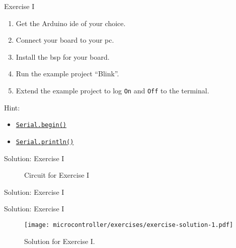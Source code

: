 \begin{frame}
    \begin{exampleblock}{Exercise I}
        \begin{enumerate}
            \item Get the Arduino\textregistered{} \acs{ide} of your choice.
            \item Connect your board to your \acs{pc}.
            \item Install the \ac{bsp} for your board.
            \item Run the example project ``Blink''.
            \item Extend the example project to log \texttt{On} and \texttt{Off} to the terminal.%
        \end{enumerate}
        \par Hint:
        \begin{itemize}
            \item \href{https://www.arduino.cc/reference/en/language/functions/communication/serial/begin/}{\texttt{Serial.begin()}}
            \item \href{https://www.arduino.cc/reference/en/language/functions/communication/serial/println/}{\texttt{Serial.println()}}
        \end{itemize}
    \end{exampleblock}
\end{frame}

\begin{frame}{Solution: Exercise I}
    \begin{figure}
        \caption{Circuit for Exercise I}
    \end{figure}
\end{frame}

\begin{frame}{Solution: Exercise I}
    \begin{listing}[H]
        \caption{Solution for Exercise I.}
        \label{lst:arduino:exercise:1:solution}
    \end{listing}
\end{frame}

\begin{frame}{Solution: Exercise I}
    \begin{figure}
        \texttt{[image: microcontroller/exercises/exercise-solution-1.pdf]}
        \caption{Solution for Exercise I.}
    \end{figure}
\end{frame}
